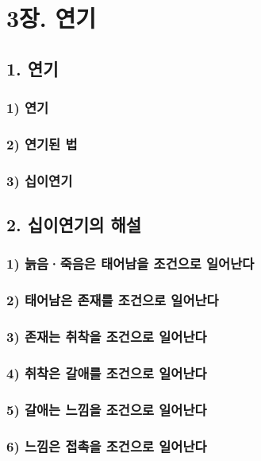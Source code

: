 \documentclass[12pt, a4paper, oneside]{book}
\begin{document}
	\part{3장. 연기}

	\newpage
	\chapter{1. 연기}
	\section{1) 연기}
	\section{2) 연기된 법}
	\section{3) 십이연기}

	\newpage
	\chapter{2. 십이연기의 해설}
	\section{1) 늙음·죽음은 태어남을 조건으로 일어난다}
	\section{2) 태어남은 존재를 조건으로 일어난다}
	\section{3) 존재는 취착을 조건으로 일어난다}
	\section{4) 취착은 갈애를 조건으로 일어난다}
	\section{5) 갈애는 느낌을 조건으로 일어난다}
	\section{6) 느낌은 접촉을 조건으로 일어난다}
\end{document}
